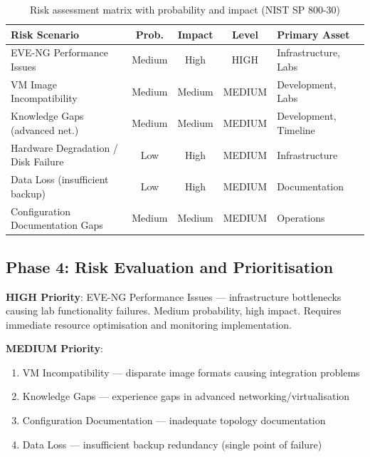 \begin{table}[H]
  \centering
  \footnotesize
  \setlength{\tabcolsep}{3pt}
  \renewcommand{\arraystretch}{1.1}
  \begin{tabularx}{\textwidth}{XcccX}
    \toprule
    \textbf{Risk Scenario} & \textbf{Prob.} & \textbf{Impact} & \textbf{Level} & \textbf{Primary Asset} \\
    \midrule
    EVE-NG Performance Issues          & Medium & High   & HIGH   & Infrastructure, Labs \\
    VM Image Incompatibility           & Medium & Medium & MEDIUM & Development, Labs \\
    Knowledge Gaps (advanced net.)     & Medium & Medium & MEDIUM & Development, Timeline \\
    Hardware Degradation / Disk Failure & Low   & High   & MEDIUM & Infrastructure \\
    Data Loss (insufficient backup)    & Low    & High   & MEDIUM & Documentation \\
    Configuration Documentation Gaps   & Medium & Medium & MEDIUM & Operations \\
    \bottomrule
  \end{tabularx}
  \caption{Risk assessment matrix with probability and impact (NIST SP 800-30)}
  \label{tab:risk_matrix_detail}
\end{table}

\subsection{Phase 4: Risk Evaluation and Prioritisation}

\textbf{HIGH Priority}: EVE-NG Performance Issues --- infrastructure bottlenecks causing
lab functionality failures. Medium probability, high impact. Requires immediate resource
optimisation and monitoring implementation.

\textbf{MEDIUM Priority}:
\begin{enumerate}
\item VM Incompatibility --- disparate image formats causing integration problems
\item Knowledge Gaps --- experience gaps in advanced networking/virtualisation
\item Configuration Documentation --- inadequate topology documentation
\item Data Loss --- insufficient backup redundancy (single point of failure)
\end{enumerate}

